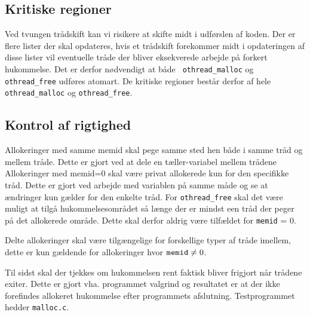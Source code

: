 \documentclass[titlepage]{article}
\begin{document}
\subsection{Kritiske regioner}
Ved tvungen trådskift kan vi risikere at skifte midt i udførslen af koden. Der er flere lister der
skal opdateres, hvis et trådskift forekommer midt i opdateringen af disse lister vil eventuelle
tråde der bliver eksekverede arbejde på forkert hukommelse. Det er derfor nødvendigt at både {\tt
othread\_malloc} og {\tt othread\_free} udføres atomart. De kritiske regioner består derfor af hele
{\tt othread\_malloc} og {\tt othread\_free}.

\subsection{Kontrol af rigtighed}
Allokeringer med samme memid skal pege samme sted hen både i samme tråd og mellem tråde. Dette er
gjort ved at dele en tæller-variabel mellem trådene
Allokeringer med memid=0 skal være privat allokerede kun for den specifikke tråd. Dette er gjort ved
arbejde med variablen på samme måde og se at ændringer kun gælder for den enkelte tråd.
For {\tt othread\_free} skal det være muligt at tilgå hukommelsesområdet så længe der er mindst een
tråd der peger på det allokerede område. Dette skal derfor aldrig være tilfældet for {\tt memid} =
0. 

Delte allokeringer skal være tilgængelige for forskellige typer af tråde imellem, dette er kun
gældende for allokeringer hvor ${\tt memid} \neq 0$.

Til sidst skal der tjekkes om hukommelsen rent faktisk bliver frigjort når trådene exiter. Dette er
gjort vha. programmet valgrind og resultatet er at der ikke forefindes allokeret hukommelse efter
programmets afslutning.
Testprogrammet hedder {\tt malloc.c}.
\end{document}
